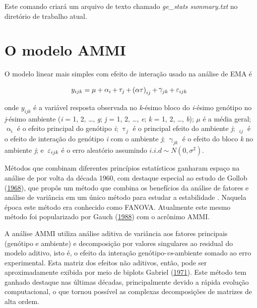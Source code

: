 \documentclass[
]{book}
\numberwithin{equation}{section}
\newcommand{\indt}[1]{\index{#1|ST}}
\begin{document}
Este comando criará um arquivo de texto chamado \emph{ge\_stats summary.txt } no diretório de trabalho atual.

\hypertarget{o-modelo-ammi}{%
\section{O modelo AMMI}\label{o-modelo-ammi}}

O modelo linear mais simples com efeito de interação usado na análise de EMA é

\[
{y_{ijk}} = {\rm{ }}\mu {\rm{ }} + \mathop \alpha \nolimits_i  + \mathop \tau \nolimits_j  + \mathop {(\alpha \tau )}\nolimits_{ij}  + \mathop \gamma \nolimits_{jk}  + {\rm{ }}\mathop \varepsilon \nolimits_{ijk}
\]

onde \({y_{ijk}}\) é a variável resposta observada no \emph{k}-ésimo bloco do \emph{i}-ésimo genótipo no \emph{j}-ésimo ambiente (\emph{i} = 1, 2, \ldots, \emph{g}; \emph{j} = 1, 2, \ldots, \emph{e}; \emph{k} = 1, 2, \ldots, \emph{b}); \(\mu\) é a média geral; \(\mathop\alpha\nolimits_i\) é o efeito principal do genótipo \emph{i}; \(\mathop \tau \nolimits_j\) é o principal efeito do ambiente \emph{j}; \(\mathop {(\alpha \tau )}\nolimits_{ij}\) é o efeito de interação do genótipo \emph{i} com o ambiente \emph{j}; \(\mathop \gamma \nolimits_{jk}\) é o efeito do bloco \emph{k} no ambiente \emph{j}; e \({\rm{ }}\mathop \varepsilon \nolimits_{ijk}\) é o erro aleatório assumindo \(i.i.d \sim N(0, \sigma^2 )\).

Métodos que combinam diferentes princípios estatísticos ganharam espaço na análise de \indt{EMA} por volta da década 1960, com destaque especial ao estudo de Gollob (\protect\hyperlink{ref-Gollob1968}{1968}), que propôs um método que combina os benefícios da análise de fatores e análise de variância em um único método para estudar a estabilidade \indt{estabilidade}. Naquela época este método era conhecido como FANOVA. Atualmente este mesmo método foi popularizado por Gauch (\protect\hyperlink{ref-Gauch1988}{1988}) com o acrônimo AMMI.

A análise AMMI \indt{AMMI}utiliza análise aditiva de variância aos fatores principais (genótipo e ambiente) e decomposição por valores singulares ao residual do modelo aditivo, isto é, o efeito da interação genótipo-\emph{vs}-ambiente somado ao erro experimental. Esta matriz dos efeitos não aditivos, então, pode ser aproximadamente exibida por meio de biplots \indt{biplots} Gabriel (\protect\hyperlink{ref-Gabriel1971}{1971}). Este método tem ganhado destaque nas últimas décadas, principalmente devido a rápida evolução computacional, o que tornou possível as complexas decomposições de matrizes de alta ordem.
\end{document}
